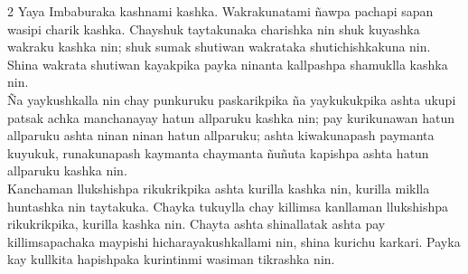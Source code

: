 \documentclass[11pt,a4paper]{article}
\begin{document}
\begin{multicols}{2}
Yaya Imbaburaka kashnami kashka. Wakrakunatami ñawpa pachapi sapan wasipi charik kashka. Chayshuk taytakunaka charishka nin shuk kuyashka wakraku kashka nin; shuk sumak shutiwan wakrataka shutichishkakuna nin. Shina wakrata shutiwan kayakpika payka ninanta kallpashpa shamuklla kashka nin.\\

Ña yaykushkalla nin chay punkuruku paskarikpika ña yaykukukpika ashta ukupi patsak achka manchanayay hatun allparuku kashka nin; pay kurikunawan hatun allparuku ashta ninan ninan hatun allparuku; ashta kiwakunapash paymanta kuyukuk, runakunapash kaymanta chaymanta ñuñuta kapishpa ashta hatun allparuku kashka nin.\\

Kanchaman llukshishpa rikukrikpika ashta kurilla kashka nin, kurilla miklla huntashka nin taytakuka. Chayka tukuylla chay killimsa kanllaman llukshishpa rikukrikpika, kurilla kashka nin. Chayta ashta shinallatak ashta pay killimsapachaka maypishi hicharayakushkallami nin, shina kurichu karkari. Payka kay kullkita hapishpaka kurintinmi wasiman tikrashka nin.\\


\end{multicols}
\end{document}
